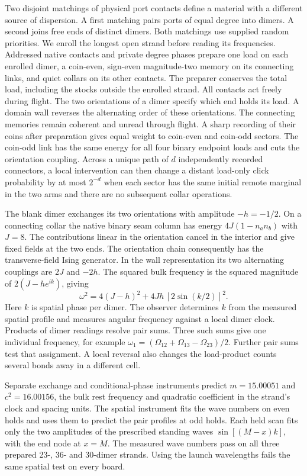 \documentclass[11pt]{article}
\theoremstyle{definition}
\theoremstyle{remark}
\theoremstyle{plain}
\begin{document}
Two disjoint matchings of physical port contacts define a material with a
different source of dispersion. A first matching pairs ports of equal
degree into dimers. A second joins free ends of distinct dimers. Both
matchings use supplied random priorities. We enroll the longest open
strand before reading its frequencies. Addressed native contacts and
private degree phases prepare one load on each enrolled dimer, a
coin-even, sign-even magnitude-two memory on its connecting links, and quiet
collars on its other contacts. The preparer conserves the total load,
including the stocks outside the enrolled strand. All contacts act freely
during flight. The two orientations of a dimer specify which end holds
its load. A domain wall reverses the alternating order of these
orientations. The connecting memories remain coherent and unread through
flight. A sharp recording of their coins after preparation gives equal
weight to coin-even and coin-odd sectors. The coin-odd link has the same
energy for all four binary endpoint loads and cuts the orientation
coupling. Across a unique path of $d$ independently recorded connectors,
a local intervention can then change a distant load-only click probability
by at most $2^{-d}$ when each sector has the same initial remote marginal
in the two arms and there are no subsequent collar operations.

The blank dimer exchanges its two orientations with amplitude
$-h=-1/2$. On a connecting collar the native binary seam column has
energy $4J(1-n_an_b)$ with $J=8$. The contributions linear in the
orientation cancel in the interior and give fixed fields at the two
ends. The orientation chain consequently has the transverse-field Ising
generator. In the wall representation its two alternating couplings are
$2J$ and $-2h$. The squared bulk frequency is the squared magnitude
of $2(J-h e^{ik})$, giving
\[
 \omega^2=4(J-h)^2+4Jh\,[2\sin(k/2)]^2 .
\]
Here $k$ is spatial phase per dimer. The observer determines $k$ from
the measured spatial profile and measures angular frequency against a
local dimer clock. Products of dimer readings resolve pair sums.
Three such sums give one individual frequency, for example
$\omega_1=(\Omega_{12}+\Omega_{13}-\Omega_{23})/2$. Further pair sums
test that assignment. A local reversal also changes the load-product
counts several bonds away in a different cell.

Separate exchange and conditional-phase instruments predict
\(m=15.00051\) and \(c^2=16.00156\), the bulk rest frequency and
quadratic coefficient in the strand's clock and spacing units. The
spatial instrument fits the wave numbers on even holds and uses
them to predict the pair profiles at odd holds. Each held scan fits
only the two amplitudes of the prescribed standing waves
\(\sin[(M-x)k]\), with the end node at \(x=M\). The measured wave
numbers pass on all three prepared 23-, 36- and 30-dimer strands.
Using the launch wavelengths fails the same spatial test on every
board.
\end{document}
